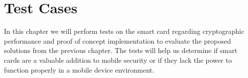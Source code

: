 \chapter{Test Cases}
In this chapter we will perform tests on the smart card regarding cryptographic performance and proof of concept implementation to evaluate the proposed solutions from the previous chapter. The tests will help us determine if smart cards are a valuable addition to mobile security or if they lack the power to function properly in a mobile device environment.







